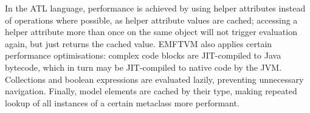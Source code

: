 \documentclass[submission,copyright,creativecommons]{eptcs}
\begin{document}
In the ATL language, performance is achieved by using helper attributes instead of operations where possible, as helper attribute values are cached; accessing a helper attribute more than once on the same object will not trigger evaluation again, but just returns the cached value. EMFTVM also applies certain performance optimisations: complex code blocks are JIT-compiled to Java bytecode, which in turn may be JIT-compiled to native code by the JVM. Collections and boolean expressions are evaluated lazily, preventing unnecessary navigation. Finally, model elements are cached by their type, making repeated lookup of all instances of a certain metaclass more performant.



\end{document}
